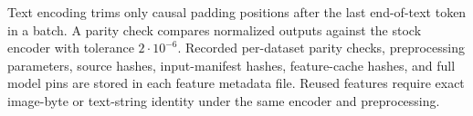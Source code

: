 Text encoding trims only causal padding positions after the last end-of-text token in a batch. A parity check compares normalized outputs against the stock encoder with tolerance $2\cdot10^{-6}$. Recorded per-dataset parity checks, preprocessing parameters, source hashes, input-manifest hashes, feature-cache hashes, and full model pins are stored in each feature metadata file. Reused features require exact image-byte or text-string identity under the same encoder and preprocessing.
